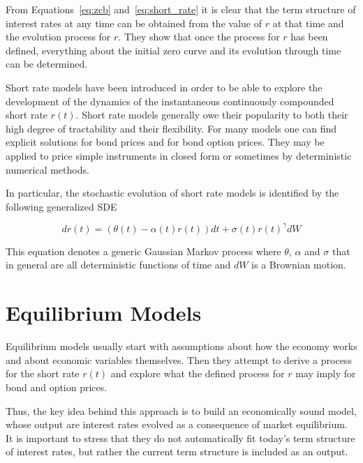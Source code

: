 
From Equations~\ref{eq:zcb} and~\ref{eq:short_rate} it is clear that the term structure of interest rates at any time can be obtained from the value of \(r\) at that time and the evolution process for \(r\). 
They show that once the process for \(r\) has been defined, everything about the initial zero curve and its evolution through time can be determined.

Short rate models have been introduced in order to be able to explore the development of the dynamics of the instantaneous continuously compounded short rate $r(t)$. Short rate models generally owe their popularity to both their high degree of tractability and their flexibility. For many models one can find explicit solutions for bond prices and for bond option prices. They may be applied to price simple instruments in closed form or sometimes by deterministic numerical methods.

In particular, the stochastic evolution of short rate models is identified by the following generalized SDE

\begin{equation}
dr(t) = (\theta(t) − \alpha(t)r(t)) dt + \sigma(t)r(t)^{\gamma} dW
\label{eq:short_rate_sde}
\end{equation}

This equation denotes a generic Gaussian Markov process where $\theta$, $\alpha$ and $\sigma$ that in general are all deterministic functions of time and $dW$ is a Brownian motion.

\section{Equilibrium Models}\label{equilibrium-models}

Equilibrium models usually start with assumptions about how the economy works and about economic variables themselves. Then they attempt to derive a process for the short rate $r(t)$ and explore what the defined process for $r$ may imply for bond and option prices.

Thus, the key idea behind this approach is to build an economically sound model, whose output are interest rates evolved as a consequence of market equilibrium. It is important to stress that they do not automatically fit today’s term structure of interest rates, but rather the current term structure is included as an output. 

